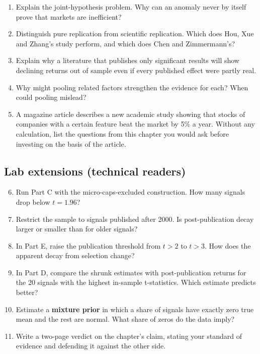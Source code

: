 \begin{enumerate}
  \item Explain the joint-hypothesis problem. Why can an anomaly never by itself prove that markets are inefficient?
  \item Distinguish pure replication from scientific replication. Which does Hou, Xue and Zhang's study perform, and which does Chen and Zimmermann's?
  \item Explain why a literature that publishes only significant results will show declining returns out of sample even if every published effect were partly real.
  \item Why might pooling related factors strengthen the evidence for each? When could pooling mislead?
  \item A magazine article describes a new academic study showing that stocks of companies with a certain feature beat the market by 5\% a year. Without any calculation, list the questions from this chapter you would ask before investing on the basis of the article.
\end{enumerate}

\subsection*{Lab extensions (technical readers)}

\begin{enumerate}
  \setcounter{enumi}{5}
  \item Run Part C with the micro-caps-excluded construction. How many signals drop below $t = 1.96$?
  \item Restrict the sample to signals published after 2000. Is post-publication decay larger or smaller than for older signals?
  \item In Part E, raise the publication threshold from $t > 2$ to $t > 3$. How does the apparent decay from selection change?
  \item In Part D, compare the shrunk estimates with post-publication returns for the 20 signals with the highest in-sample t-statistics. Which estimate predicts better?
  \item Estimate a \textbf{mixture prior} in which a share of signals have exactly zero true mean and the rest are normal. What share of zeros do the data imply?
  \item Write a two-page verdict on the chapter's claim, stating your standard of evidence and defending it against the other side.
\end{enumerate}

